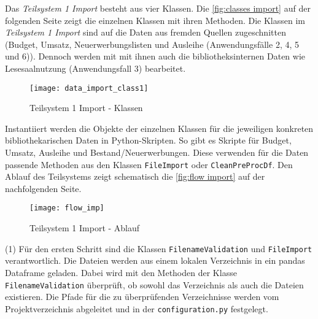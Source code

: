     Das \textit{Teilsystem 1 Import} besteht aus vier Klassen. Die \autoref{fig:classes import} auf der folgenden Seite zeigt die einzelnen Klassen mit ihren Methoden.
    Die Klassen im \textit{Teilsystem 1 Import} sind auf die Daten aus fremden Quellen zugeschnitten
    (Budget, Umsatz, Neuerwerbungslisten und Ausleihe (Anwendungsfälle 2, 4, 5 und 6)). Dennoch werden mit mit ihnen auch die bibliotheksinternen Daten
    wie Lesesaalnutzung (Anwendungsfall 3) bearbeitet. 
    \begin{figure}[H]
        \centering
            \texttt{[image: data\_import\_class1]}
            \caption{Teilsystem 1 Import - Klassen}
            \label{fig:classes import}
    \end{figure}

    Instantiiert werden die Objekte der einzelnen Klassen für die jeweiligen konkreten bibliothekarischen Daten in Python-Skripten. 
    So gibt es Skripte für Budget, Umsatz, Ausleihe und Bestand/Neuerwerbungen. Diese verwenden für die Daten passende Methoden
    aus den Klassen \texttt{FileImport} oder \texttt{CleanPreProcDf}.
    Den Ablauf des Teilsystems zeigt schematisch die \autoref{fig:flow import} auf der nachfolgenden Seite.

    \begin{figure}[H]
        \centering
            \texttt{[image: flow\_imp]}
            \caption{Teilsystem 1 Import - Ablauf}
            \label{fig:flow import}
    \end{figure}

    
    (1) Für den ersten Schritt sind die Klassen \texttt{FilenameValidation} und \texttt{FileImport} verantwortlich.
    Die Dateien werden aus einem lokalen Verzeichnis in ein pandas Dataframe geladen. 
    Dabei wird mit den Methoden der Klasse \texttt{FilenameValidation} überprüft, ob sowohl das Verzeichnis als auch die Dateien existieren.
    Die Pfade für die zu überprüfenden Verzeichnisse werden vom Projektverzeichnis abgeleitet und in der \texttt{configuration.py} festgelegt.
    
